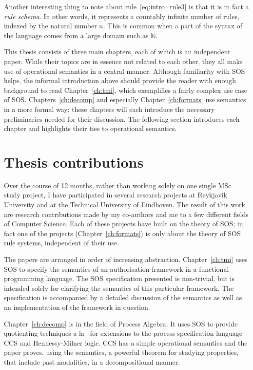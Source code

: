 Another interesting thing to note about rule~\ref{eq:intro_rule3} is that it is
in fact a \emph{rule schema}. In other words, it represents a countably infinite
number of rules, indexed by the natural number $n$. This is common when a part
of the syntax of the language comes from a large domain such as $\mathbb{N}$.

\vspace{1em}

This thesis consists of three main chapters, each of which is an independent paper.
While their topics are in essence not related to each other, they all make use of
operational semantics in a central manner. Although familiarity with SOS helps, the
informal introduction above should provide the reader with enough background to read
Chapter~\ref{ch:tmi}, which exemplifies a fairly complex use case of SOS. 
Chapters~\ref{ch:decomp} and especially Chapter~\ref{ch:formats} use semantics in a more
formal way; these chapters will each introduce the necessary preliminaries needed
for their discussion. The following section introduces each chapter and highlights
their ties to operational semantics.


\section{Thesis contributions} %

Over the course of 12 months, rather than working solely on one single MSc study project,
I have participated in several research projects at
Reykjavik University and at the Technical University of Eindhoven. The result of this work
are research contributions made by my co-authors and me to a few different fields
of Computer Science. Each of these projects have built on the theory of SOS; in fact
one of the projects (Chapter~\ref{ch:formats}) is only about the theory of SOS rule
systems, independent of their use.

The papers are arranged in order of increasing abstraction. Chapter~\ref{ch:tmi} uses SOS
to specify the semantics of an authorisation framework in a functional programming language.
The SOS specification presented is non-trivial, but is intended solely for clarifying
the semantics of this particular framework. The specification is accompanied by a
detailed discussion of the semantics as well as an implementation of the framework
in question.

Chapter~\ref{ch:decomp} is in the field of Process Algebra. It 
uses SOS to provide quotienting techniques a la~\cite{Larsen91} for extensions
to the process specification language CCS and Hennessy-Milner logic. CCS has a simple
operational semantics and the paper proves, using the semantics, a powerful theorem
for studying properties, that include past modalities, in a decompositional manner.

